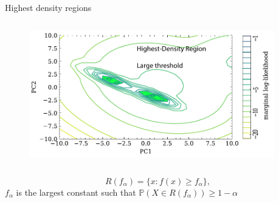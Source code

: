 \documentclass[t]{beamer}
\newcommand{\prob}{\mathbb{P}}
\theoremstyle{definition}
\begin{document}
\begin{frame}{Highest density regions}

    \begin{columns}[T] %
    
    \begin{column}{0.5\textwidth} %
    
        \begin{figure}
        \includegraphics[width=\textwidth]{figs/de_pc1_pc2_likelihood_hdr_large_threshold.pdf}
    \end{figure}
    \end{column}
    
    \begin{column}{0.5\textwidth} %
    \end{column}
    
    \end{columns}
    \begin{definition}
        \begin{equation*}
            R(f_\alpha) = \{ x : f(x) \geq f_\alpha \},
        \end{equation*}
        $f_\alpha$ is the largest constant such that $\prob(X \in R(f_\alpha)) \geq 1-\alpha$
    \end{definition}


\end{frame}
\end{document}
